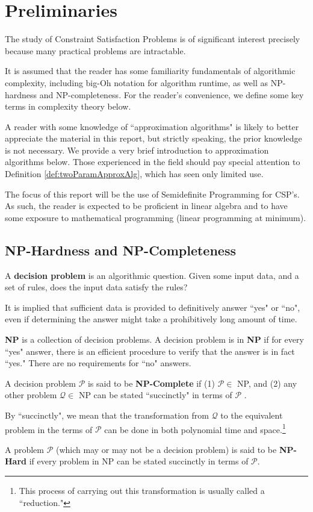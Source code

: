 \section{Preliminaries}
The study of Constraint Satisfaction Problems is of significant interest precisely because many practical problems are intractable.  

It is assumed that the reader has some familiarity fundamentals of algorithmic complexity, including big-Oh notation for algorithm runtime, as well as NP-hardness and NP-completeness. 
For the reader's convenience, we define some key terms in complexity theory below.

A reader with some knowledge of ``approximation algorithms" is likely to better appreciate the material in this report, but strictly speaking, the prior knowledge is not necessary. 
We provide a very brief introduction to approximation algorithms below. 
Those experienced in the field should pay special attention to Definition \ref{def:twoParamApproxAlg}, which has seen only limited use.

The focus of this report will be the use of Semidefinite Programming for CSP's. As such, the reader is expected to be proficient in linear algebra and to have some exposure to mathematical programming (linear programming at minimum).

\subsection{NP-Hardness and NP-Completeness}
\begin{ILdefinition}
A \textbf{decision problem} is an algorithmic question.
Given some input data, and a set of rules, does the input data satisfy the rules?
\end{ILdefinition}
It is implied that sufficient data is provided to definitively answer ``yes" or ``no", even if determining the answer might take a prohibitively long amount of time.
\begin{ILdefinition}
\textbf{NP} is a collection of decision problems. A decision problem is in \textbf{NP} if for every ``yes" answer, there is an efficient procedure to verify that the answer is in fact ``yes." 
There are no requirements for ``no" answers.
\end{ILdefinition}
\begin{ILdefinition}
A decision problem $\mathcal{P}$ is said to be \textbf{NP-Complete} if (1)
$\mathcal{P} \in $ NP, and (2) any other problem $\mathcal{Q} \in$ NP can be stated ``succinctly" in terms of $\mathcal{P}$ .
\end{ILdefinition}
By ``succinctly", we mean that the transformation from $\mathcal{Q}$ to the equivalent problem in the terms of $\mathcal{P}$ can be done in both polynomial time and space.\footnote{This process of carrying out this transformation is usually called a ``reduction."}
\begin{ILdefinition}
A problem $\mathcal{P}$ (which may or may not be a decision problem) is said to be \textbf{NP-Hard} if every problem in NP can be stated succinctly in terms of $\mathcal{P}$.
\end{ILdefinition}

